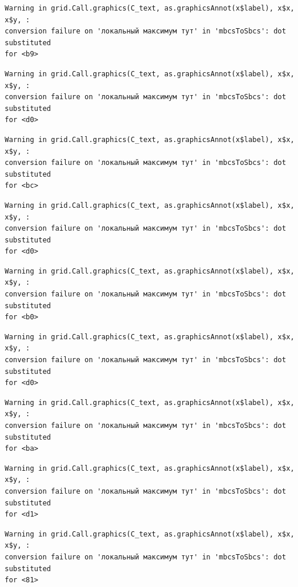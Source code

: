 \documentclass[
  letterpaper,
  DIV=11,
  numbers=noendperiod]{scrreprt}
\theoremstyle{definition}
\theoremstyle{remark}
\begin{document}
\begin{verbatim}
Warning in grid.Call.graphics(C_text, as.graphicsAnnot(x$label), x$x, x$y, :
conversion failure on 'локальный максимум тут' in 'mbcsToSbcs': dot substituted
for <b9>
\end{verbatim}

\begin{verbatim}
Warning in grid.Call.graphics(C_text, as.graphicsAnnot(x$label), x$x, x$y, :
conversion failure on 'локальный максимум тут' in 'mbcsToSbcs': dot substituted
for <d0>
\end{verbatim}

\begin{verbatim}
Warning in grid.Call.graphics(C_text, as.graphicsAnnot(x$label), x$x, x$y, :
conversion failure on 'локальный максимум тут' in 'mbcsToSbcs': dot substituted
for <bc>
\end{verbatim}

\begin{verbatim}
Warning in grid.Call.graphics(C_text, as.graphicsAnnot(x$label), x$x, x$y, :
conversion failure on 'локальный максимум тут' in 'mbcsToSbcs': dot substituted
for <d0>
\end{verbatim}

\begin{verbatim}
Warning in grid.Call.graphics(C_text, as.graphicsAnnot(x$label), x$x, x$y, :
conversion failure on 'локальный максимум тут' in 'mbcsToSbcs': dot substituted
for <b0>
\end{verbatim}

\begin{verbatim}
Warning in grid.Call.graphics(C_text, as.graphicsAnnot(x$label), x$x, x$y, :
conversion failure on 'локальный максимум тут' in 'mbcsToSbcs': dot substituted
for <d0>
\end{verbatim}

\begin{verbatim}
Warning in grid.Call.graphics(C_text, as.graphicsAnnot(x$label), x$x, x$y, :
conversion failure on 'локальный максимум тут' in 'mbcsToSbcs': dot substituted
for <ba>
\end{verbatim}

\begin{verbatim}
Warning in grid.Call.graphics(C_text, as.graphicsAnnot(x$label), x$x, x$y, :
conversion failure on 'локальный максимум тут' in 'mbcsToSbcs': dot substituted
for <d1>
\end{verbatim}

\begin{verbatim}
Warning in grid.Call.graphics(C_text, as.graphicsAnnot(x$label), x$x, x$y, :
conversion failure on 'локальный максимум тут' in 'mbcsToSbcs': dot substituted
for <81>
\end{verbatim}
\end{document}
